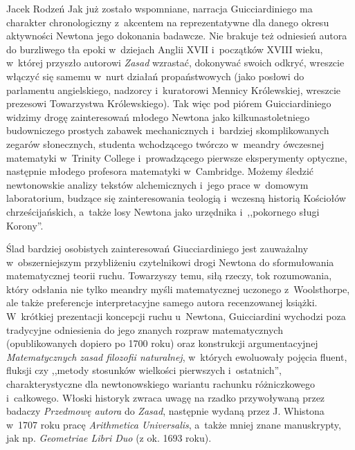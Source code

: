 \begin{recplenv}{Jacek Rodzeń}
Jak już zostało wspomniane, narracja Guicciardiniego ma charakter chronologiczny z~akcentem na reprezentatywne dla
danego okresu aktywności Newtona jego dokonania badawcze. Nie brakuje też odniesień autora do burzliwego tła
epoki w~dziejach Anglii XVII i~początków XVIII wieku, w~której przyszło autorowi \textit{Zasad} wzrastać, dokonywać swoich
odkryć, wreszcie włączyć się samemu w~nurt działań propaństwowych (jako posłowi do parlamentu angielskiego,
nadzorcy i~kuratorowi Mennicy Królewskiej, wreszcie prezesowi Towarzystwa Królewskiego). Tak więc pod piórem Guicciardiniego
widzimy drogę zainteresowań młodego Newtona jako kilkunastoletniego budowniczego prostych zabawek
mechanicznych i~bardziej skomplikowanych zegarów słonecznych, studenta wchodzącego twórczo w~meandry ówczesnej
matematyki w~Trinity College i~prowadzącego pierwsze eksperymenty optyczne, następnie młodego profesora
matematyki w~Cambridge. Możemy śledzić newtonowskie analizy tekstów alchemicznych i~jego prace w~domowym
laboratorium, budzące się
zainteresowania teologią i~wczesną historią Kościołów chrześcijańskich, a~także losy Newtona jako
urzędnika i~,,pokornego sługi Korony''.

Ślad bardziej osobistych zainteresowań Giucciardiniego jest zauważalny w~obszerniejszym przybliżeniu czytelnikowi
drogi Newtona do sformułowania matematycznej teorii ruchu. Towarzyszy temu, siłą rzeczy, tok rozumowania, który
odsłania nie tylko meandry myśli matematycznej uczonego z~Woolsthorpe, ale także preferencje interpretacyjne samego
autora recenzowanej książki. W~krótkiej prezentacji koncepcji ruchu u~Newtona, Guicciardini wychodzi poza tradycyjne
odniesienia do jego znanych rozpraw matematycznych (opublikowanych dopiero po 1700 roku) oraz konstrukcji
argumentacyjnej \textit{Matematycznych zasad filozofii naturalnej}, w~których ewoluowały pojęcia fluent, fluksji czy
,,metody stosunków wielkości pierwszych i~ostatnich'', charakterystyczne dla newtonowskiego wariantu rachunku
różniczkowego i~całkowego. Włoski historyk zwraca uwagę na rzadko przywoływaną przez badaczy \textit{Przedmowę autora}
do \textit{Zasad}, następnie wydaną przez J. Whistona w~1707 roku pracę \textit{Arithmetica Universalis}, a~także mniej
znane manuskrypty, jak np. \textit{Geometriae Libri Duo }(z ok. 1693 roku). 


\end{recplenv}
